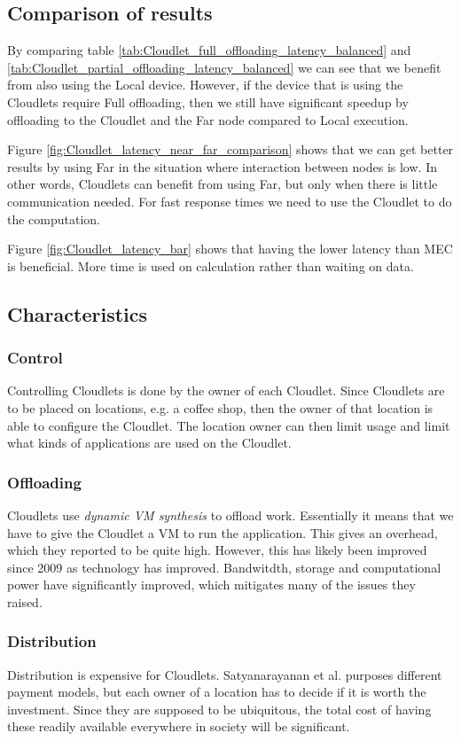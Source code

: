 \subsection{Comparison of results}
By comparing table \ref{tab:Cloudlet_full_offloading_latency_balanced} and \ref{tab:Cloudlet_partial_offloading_latency_balanced} we can see that we benefit from also using the Local device. However, if the device that is using the Cloudlets require Full offloading, then we still have significant speedup by offloading to the Cloudlet and the Far node compared to Local execution.

Figure \ref{fig:Cloudlet_latency_near_far_comparison} shows that we can get better results by using Far in the situation where interaction between nodes is low. In other words, Cloudlets can benefit from using Far, but only when there is little communication needed. For fast response times we need to use the Cloudlet to do the computation. 

Figure \ref{fig:Cloudlet_latency_bar} shows that having the lower latency than MEC is beneficial. More time is used on calculation rather than waiting on data.



\subsection{Characteristics}
\subsubsection{Control}
Controlling Cloudlets is done by the owner of each Cloudlet. Since Cloudlets are to be placed on locations, e.g. a coffee shop, then the owner of that location is able to configure the Cloudlet. The location owner can then limit usage and limit what kinds of applications are used on the Cloudlet.
\subsubsection{Offloading}
Cloudlets use \textit{dynamic VM synthesis} \cite{satyanarayanan_case_2009} to offload work. Essentially it means that we have to give the Cloudlet a VM to run the application. This gives an overhead, which they reported to be quite high. However, this has likely been improved since 2009 as technology has improved. Bandwitdth, storage and computational power have significantly improved, which mitigates many of the issues they raised.
\subsubsection{Distribution}
Distribution is expensive for Cloudlets. Satyanarayanan et al.\cite{satyanarayanan_case_2009} purposes different payment models, but each owner of a location has to decide if it is worth the investment. Since they are supposed to be ubiquitous, the total cost of having these readily available everywhere in society will be significant. 
